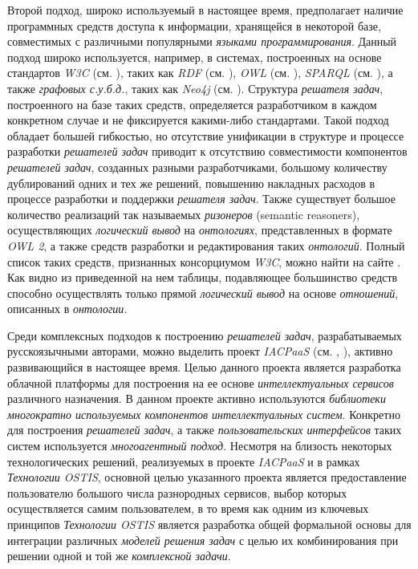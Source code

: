 Второй подход, широко используемый в настоящее время, предполагает наличие программных средств доступа к информации, хранящейся в некоторой базе, совместимых с различными популярными \textit{языками программирования}. Данный подход широко используется, например, в системах, построенных на основе стандартов \textit{W3C} (см. ), таких как \textit{RDF} (см. ), \textit{OWL} (см. ), \textit{SPARQL} (см. ), а также \textit{графовых с.у.б.д.}, таких как \textit{Neo4j} (см. ). Структура \textit{решателя задач}, построенного на базе таких средств, определяется разработчиком в каждом конкретном случае и не фиксируется какими-либо стандартами. Такой подход обладает большей гибкостью, но отсутствие унификации в структуре и процессе разработки \textit{решателей задач} приводит к отсутствию совместимости компонентов \textit{решателей задач}, созданных разными разработчиками, большому количеству дублирований одних и тех же решений, повышению накладных расходов в процессе разработки и поддержки \textit{решателя задач}. Также существует большое количество реализаций так называемых \textit{ризонеров} (semantic reasoners), осуществляющих \textit{логический вывод} на \textit{онтологиях}, представленных в формате \textit{OWL 2}, а также средств разработки и редактирования таких \textit{онтологий}. Полный список таких средств, признанных консорциумом \textit{W3C}, можно найти на сайте . Как видно из приведенной на нем таблицы, подавляющее большинство средств способно осуществлять только прямой \textit{логический вывод} на основе \textit{отношений}, описанных в \textit{онтологии}.

Среди комплексных подходов к построению \textit{решателей задач}, разрабатываемых русскоязычными авторами, можно выделить проект \textit{IACPaaS} (см. ,  ), активно развивающийся в настоящее время. Целью данного проекта является разработка облачной платформы для построения на ее основе \textit{интеллектуальных сервисов} различного назначения. В данном проекте активно используются \textit{библиотеки многократно используемых компонентов интеллектуальных систем}. Конкретно для построения \textit{решателей задач}, а также \textit{пользовательских интерфейсов} таких систем используется \textit{многоагентный подход}. Несмотря на близость некоторых технологических решений, реализуемых в проекте \textit{IACPaaS} и в рамках \textit{Технологии OSTIS}, основной целью указанного проекта является предоставление пользователю большого числа разнородных сервисов, выбор которых осуществляется самим пользователем, в то время как одним из ключевых принципов \textit{Технологии OSTIS} является разработка общей формальной основы для интеграции различных \textit{моделей решения задач} с целью их комбинирования при решении одной и той же \textit{комплексной задачи}.


